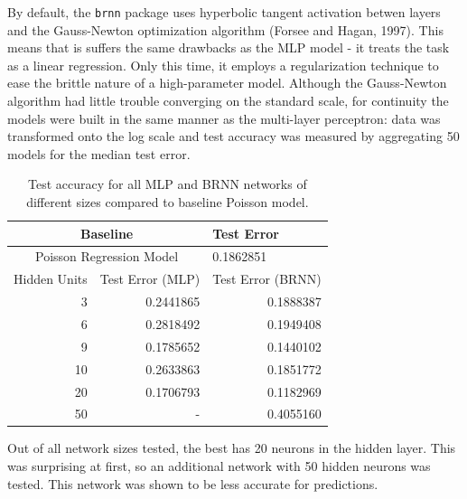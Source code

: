 By default, the \texttt{brnn} package uses hyperbolic tangent activation betwen layers and the Gauss-Newton optimization algorithm (Forsee and Hagan, 1997).  This means that is suffers the same drawbacks as the MLP model - it treats the task as a linear regression.  Only this time, it employs a regularization technique to ease the brittle nature of a high-parameter model.
Although the Gauss-Newton algorithm had little trouble converging on the standard scale, for continuity the models were built in the same manner as the multi-layer perceptron: data was transformed onto the log scale and test accuracy was measured by aggregating 50 models for the median test error.

\begin{table}[H]
\centering
\begin{tabular}{rrr}
  \hline
\multicolumn{2}{c}{Baseline} & \multicolumn{1}{l}{Test Error} \\ 
  \hline
  \multicolumn{2}{c}{Poisson Regression Model} & \multicolumn{1}{l}{0.1862851} \\ 
  \hline
Hidden Units & Test Error (MLP) & Test Error (BRNN) \\ 
  \hline
3 & 0.2441865  & 0.1888387 \\ 
6 & 0.2818492  & 0.1949408 \\ 
9 & 0.1785652  & 0.1440102 \\ 
10 & 0.2633863  & 0.1851772 \\ 
20 & 0.1706793  & 0.1182969 \\ 
 50 & - & 0.4055160 \\ 
   \hline
\end{tabular}
   \caption{Test accuracy for all MLP and BRNN networks of different sizes compared to baseline Poisson model.}
\end{table}



Out of all network sizes tested, the best has 20 neurons in the hidden layer.  This was surprising at first, so an additional network with 50 hidden neurons was tested.  This network was shown to be less accurate for predictions.


